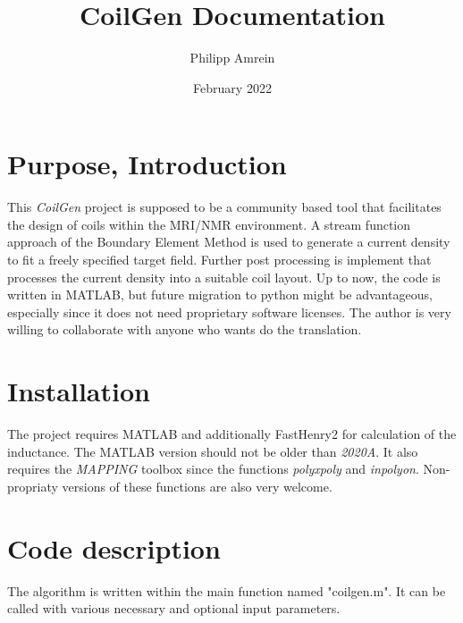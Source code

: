 \documentclass[a4paper,12pt]{book}
\begin{document}
\begin{titlepage}
\author{Philipp Amrein}
\title{CoilGen Documentation}
\date{February 2022}
\end{titlepage}


\maketitle
\tableofcontents

\newpage

\section{{Purpose, Introduction}}
This \textit{CoilGen} project is supposed to be a community based tool that facilitates the design of coils within the MRI/NMR environment. A stream function approach of the Boundary Element Method is used to generate a current density to fit a freely specified target field. Further post processing is implement that processes the current density into a suitable coil layout.
Up to now, the code is written in MATLAB, but future migration to python might be advantageous, especially since it does not need proprietary software licenses. The author is very willing to collaborate with anyone who wants do the translation.

\section{Installation}
The project requires MATLAB and additionally FastHenry2 for calculation of the inductance.  The MATLAB version should not be older than \textit{2020A}. It also requires the \textit{MAPPING} toolbox since the functions \textit{polyxpoly} and \textit{inpolyon}. Non-propriaty versions of these functions are also very welcome.

\section{Code description}
The algorithm is written within the main function named "coilgen.m". It can be called with various necessary and optional input parameters.
\end{document}
